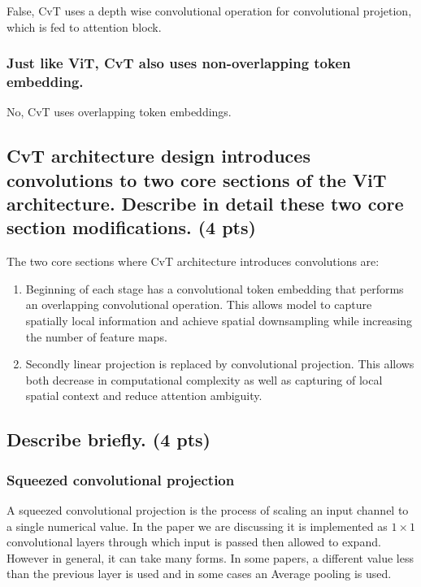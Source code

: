 \documentclass{article}
\begin{document}
False, CvT uses a depth wise convolutional operation for convolutional projetion, which is fed to attention block. 

\subsubsection{Just like ViT, CvT also uses non-overlapping token embedding.}

No, CvT uses overlapping token embeddings.

\subsection{CvT architecture design introduces convolutions to two core sections of the ViT architecture. Describe in detail these two core section modifications. (4 pts)}

The two core sections where CvT architecture introduces convolutions are:
\begin{enumerate}
    \item Beginning of each stage has a convolutional token embedding that performs an overlapping convolutional operation. This allows model to capture spatially local information and achieve spatial downsampling while increasing the number of feature maps.
    
    \item Secondly linear projection is replaced by convolutional projection. This allows both decrease in computational complexity as well as capturing of local spatial context and reduce attention ambiguity.
\end{enumerate}

\subsection{ Describe briefly. (4 pts)}
\subsubsection{Squeezed convolutional projection}

A squeezed convolutional projection is the process of scaling an input channel to a single numerical value. In the paper we are discussing it is implemented as $1\times 1$ convolutional layers through which input is passed then allowed to expand. 
However in general, it can take many forms. In some papers, a different value less than the previous layer is used and in some cases an Average pooling is used.
\end{document}
